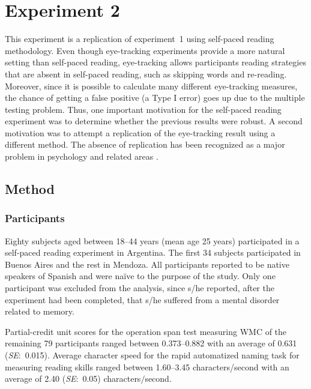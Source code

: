 \documentclass{frontiersSCNS}\usepackage{knitr}
\begin{document}
 \section{Experiment 2} 





This experiment is a replication of experiment~1 using self-paced reading methodology. Even though eye-tracking experiments provide a more natural setting than self-paced reading, eye-tracking allows participants reading strategies that are absent in self-paced reading, such as skipping words and re-reading. Moreover, since it is possible to calculate many different eye-tracking measures, the chance of getting a false positive (a Type I error) goes up due to the multiple testing problem. Thus, one important motivation for the self-paced reading experiment was to determine whether the previous results were robust. A second motivation was to attempt a replication of the eye-tracking result using a different method. The absence of replication  has been recognized as a major problem in psychology and related areas \citep{AsendorpfEtAl2013}. 



\subsection{Method}
\subsubsection{Participants}
Eighty subjects aged between 18--44 years  (mean age 25 years)  participated in a self-paced reading experiment in Argentina. The first 34 subjects participated in Buenos Aires and the rest in Mendoza. All participants reported to be native speakers of Spanish and were na\"{i}ve to the purpose of the study. Only one participant was excluded from the analysis, since s/he reported, after the experiment had been completed, that s/he suffered from a mental disorder related to memory.



Partial-credit unit scores for the operation span test measuring WMC of the remaining 79 participants ranged between 0.373--0.882 with an average of 0.631 (\textit{SE}:~0.015). Average character speed for the rapid automatized naming task for measuring reading skills ranged between 1.60--3.45 characters/second with an average of 2.40 (\textit{SE}:~0.05) characters$/$second.
\end{document}
